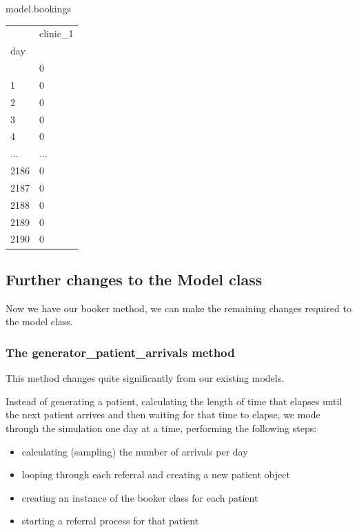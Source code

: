 \documentclass[
  letterpaper,
  DIV=11,
  numbers=noendperiod]{scrreprt}
\newenvironment{Shaded}{}{}
\newcommand{\NormalTok}[1]{\textcolor[rgb]{0.14,0.16,0.18}{#1}}
\providecommand{\tightlist}{%
  \setlength{\itemsep}{0pt}\setlength{\parskip}{0pt}}\usepackage{longtable,booktabs,array}
\begin{document}
\begin{Shaded}
\begin{Highlighting}[]
\NormalTok{model.bookings}
\end{Highlighting}
\end{Shaded}

\begin{longtable}[]{@{}ll@{}}
\toprule\noalign{}
& clinic\_1 \\
day & \\
\midrule\noalign{}
\endhead
\bottomrule\noalign{}
\endlastfoot
0 & 0 \\
1 & 0 \\
2 & 0 \\
3 & 0 \\
4 & 0 \\
... & ... \\
2186 & 0 \\
2187 & 0 \\
2188 & 0 \\
2189 & 0 \\
2190 & 0 \\
\end{longtable}

\subsection{Further changes to the Model
class}\label{further-changes-to-the-model-class}

Now we have our booker method, we can make the remaining changes
required to the model class.

\subsubsection{The generator\_patient\_arrivals
method}\label{the-generator_patient_arrivals-method-4}

This method changes quite significantly from our existing models.

Instead of generating a patient, calculating the length of time that
elapses until the next patient arrives and then waiting for that time to
elapse, we mode through the simulation one day at a time, performing the
following steps:

\begin{itemize}
\tightlist
\item
  calculating (sampling) the number of arrivals per day
\item
  looping through each referral and creating a new patient object
\item
  creating an instance of the booker class for each patient
\item
  starting a referral process for that patient
\end{itemize}
\end{document}
